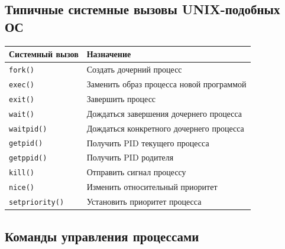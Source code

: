 \documentclass[12pt,a4paper]{article}
\begin{document}
\subsection{Типичные системные вызовы UNIX-подобных ОС}

\begin{longtable}{|p{4cm}|p{9cm}|}
\hline
\textbf{Системный вызов} & \textbf{Назначение} \\
\hline
\texttt{fork()} & Создать дочерний процесс \\
\hline
\texttt{exec()} & Заменить образ процесса новой программой \\
\hline
\texttt{exit()} & Завершить процесс \\
\hline
\texttt{wait()} & Дождаться завершения дочернего процесса \\
\hline
\texttt{waitpid()} & Дождаться конкретного дочернего процесса \\
\hline
\texttt{getpid()} & Получить PID текущего процесса \\
\hline
\texttt{getppid()} & Получить PID родителя \\
\hline
\texttt{kill()} & Отправить сигнал процессу \\
\hline
\texttt{nice()} & Изменить относительный приоритет \\
\hline
\texttt{setpriority()} & Установить приоритет процесса \\
\hline
\end{longtable}

\subsection{Команды управления процессами}
\end{document}
